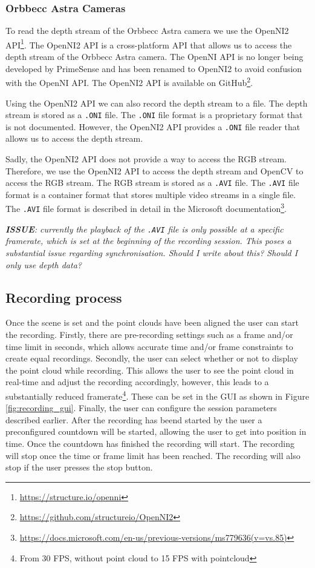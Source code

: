 \subsubsection{Orbbecc Astra Cameras}

To read the depth stream of the Orbbecc Astra camera we use the OpenNI2 API\footnote{\url{https://structure.io/openni}}. The OpenNI2 API is a cross-platform API that allows us to access the depth stream of the Orbbecc Astra camera. The OpenNI API is no longer being developed by PrimeSense and has been renamed to OpenNI2 to avoid confusion with the OpenNI API. The OpenNI2 API is available on GitHub\footnote{\url{https://github.com/structureio/OpenNI2}}.

Using the OpenNI2 API we can also record the depth stream to a file. The depth stream is stored as a \texttt{.ONI} file. The \texttt{.ONI} file format is a proprietary format that is not documented. However, the OpenNI2 API provides a \texttt{.ONI} file reader that allows us to access the depth stream.

Sadly, the OpenNI2 API does not provide a way to access the RGB stream. Therefore, we use the OpenNI2 API to access the depth stream and OpenCV to access the RGB stream. The RGB stream is stored as a \texttt{.AVI} file. The \texttt{.AVI} file format is a container format that stores multiple video streams in a single file. The \texttt{.AVI} file format is described in detail in the Microsoft documentation\footnote{\url{https://docs.microsoft.com/en-us/previous-versions/ms779636(v=vs.85)}}. 

\textit{
  \textbf{ISSUE}: currently the playback of the \texttt{.AVI} file is only possible at a specific framerate, which is set at the beginning of the recording session. This poses a substantial issue regarding synchronisation. Should I write about this? Should I only use depth data? 
}

\subsection{Recording process}

Once the scene is set and the point clouds have been aligned the user can start the recording. Firstly, there are pre-recording settings such as a frame and/or time limit in seconds, which allows accurate time and/or frame constraints to create equal recordings. Secondly, the user can select whether or not to display the point cloud while recording. This allows the user to see the point cloud in real-time and adjust the recording accordingly, however, this leads to a substantially reduced framerate\footnote{From 30 FPS, without point cloud to 15 FPS with pointcloud}. These can be set in the GUI as shown in Figure \ref{fig:recording_gui}. Finally, the user can configure the session parameters described earlier. After the recording has beend started by the user a preconfigured countdown will be started, allowing the user to get into position in time. Once the countdown has finished the recording will start. The recording will stop once the time or frame limit has been reached. The recording will also stop if the user presses the stop button.  

